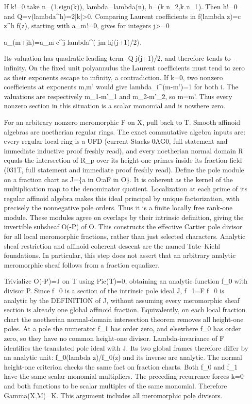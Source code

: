 \documentclass[11pt]{article}
\begin{document}
If k!=0 take n=(1,sign(k)), lambda=lambda(n), h=(k n\_2,k n\_1). Then h!=0 and Q=v(lambda\textasciicircum{}h)=2|k|>0. Comparing Laurent coefficients in f(lambda z)=c z\textasciicircum{}h f(z), starting with a\_m!=0, gives for integers j>=0

a\_(m+jh)=a\_m c\textasciicircum{}j lambda\textasciicircum{}(-jm-hj(j+1)/2).

Its valuation has quadratic leading term -Q j(j+1)/2, and therefore tends to -infinity. On the fixed unit polyannulus the Laurent coefficients must tend to zero as their exponents escape to infinity, a contradiction. If k=0, two nonzero coefficients at exponents m,m' would give lambda\_i\textasciicircum{}(m-m')=1 for both i. The valuations are respectively m\_1-m'\_1 and m\_2-m'\_2, so m=m'. Thus every nonzero section in this situation is a scalar monomial and is nowhere zero.

For an arbitrary nonzero meromorphic F on X, pull back to T. Smooth affinoid algebras are noetherian regular rings. The exact commutative algebra inputs are: every regular local ring is a UFD (current Stacks 0AG0, full statement and immediate inductive proof freshly read), and every noetherian normal domain R equals the intersection of R\_p over its height-one primes inside its fraction field (031T, full statement and immediate proof freshly read). Define the pole module on a fraction chart as J=\{a in O:aF in O\}. It is coherent as the kernel of the multiplication map to the denominator quotient. Localization at each prime of its regular affinoid algebra makes this ideal principal by unique factorization, with precisely the nonnegative pole orders. Thus it is a finite locally free rank-one module. These modules agree on overlaps by their intrinsic definition, giving the invertible subsheaf O(-P) of O. This constructs the effective Cartier pole divisor for all local meromorphic fractions, rather than just selected characters. Analytic sheaf restriction and affinoid coherent descent are the named Tate--Kiehl foundations. In particular, this step does not assert that an arbitrary analytic meromorphic sheaf follows from a fraction equalizer.

Trivialize O(-P)=J on T using Pic(T)=0, obtaining an analytic function f\_0 with divisor P. Since f\_0 is a section of the intrinsic pole ideal J, f\_1=F f\_0 is analytic by the DEFINITION of J, without assuming every meromorphic sheaf section is already one global affinoid fraction. Equivalently, on each local fraction chart the noetherian normal-domain intersection theorem removes all height-one poles. At a pole the numerator f\_1 has order zero, and elsewhere f\_0 has order zero, so they have no common height-one divisor. Lambda-invariance of F identifies the translated pole ideal with J. Its two global frames therefore differ by an analytic unit: f\_0(lambda z)/f\_0(z) and its inverse are analytic. The normal height-one criterion checks the same fact on fraction charts. Both f\_0 and f\_1 have the same scalar-monomial multipliers. The preceding recurrence forces k=0 and both functions to be scalar multiples of the same monomial. Therefore Gamma(X,M)=K. This argument includes all meromorphic pole divisors.
\end{document}

